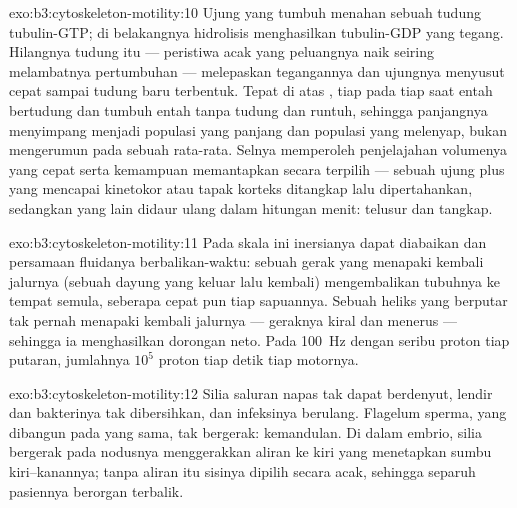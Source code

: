 \begin{solution}{exo:b3:cytoskeleton-motility:10}
Ujung yang tumbuh menahan sebuah tudung tubulin-GTP; di belakangnya hidrolisis
menghasilkan tubulin-GDP yang tegang. Hilangnya tudung itu --- peristiwa acak
yang peluangnya naik seiring melambatnya pertumbuhan --- melepaskan tegangannya
dan ujungnya menyusut cepat sampai tudung baru terbentuk. Tepat di atas
, tiap  pada tiap saat entah bertudung dan
tumbuh entah tanpa tudung dan runtuh, sehingga panjangnya menyimpang menjadi
populasi yang panjang dan populasi yang melenyap, bukan mengerumun pada sebuah
rata-rata. Selnya memperoleh penjelajahan volumenya yang cepat serta kemampuan
memantapkan secara terpilih --- sebuah ujung plus yang mencapai kinetokor atau
tapak korteks ditangkap lalu dipertahankan, sedangkan yang lain didaur ulang
dalam hitungan menit: telusur dan tangkap.
\end{solution}

\begin{solution}{exo:b3:cytoskeleton-motility:11}
Pada skala ini inersianya dapat diabaikan dan persamaan fluidanya
berbalikan-waktu: sebuah gerak yang menapaki kembali jalurnya (sebuah dayung
yang keluar lalu kembali) mengembalikan tubuhnya ke tempat semula, seberapa
cepat pun tiap sapuannya. Sebuah heliks yang berputar tak pernah menapaki
kembali jalurnya --- geraknya kiral dan menerus --- sehingga ia menghasilkan
dorongan neto. Pada \qty{100}{Hz} dengan seribu proton tiap putaran, jumlahnya
$10^{5}$ proton tiap detik tiap motornya.
\end{solution}

\begin{solution}{exo:b3:cytoskeleton-motility:12}
Silia saluran napas tak dapat berdenyut, lendir dan bakterinya tak
dibersihkan, dan infeksinya berulang. Flagelum sperma, yang dibangun pada
 yang sama, tak bergerak: kemandulan. Di dalam embrio, silia bergerak
pada nodusnya menggerakkan aliran ke kiri yang menetapkan sumbu kiri--kanannya;
tanpa aliran itu sisinya dipilih secara acak, sehingga separuh pasiennya
berorgan terbalik.
\end{solution}

